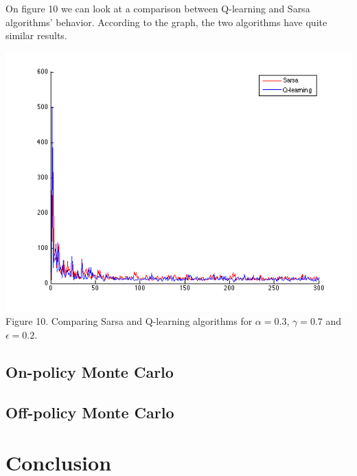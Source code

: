 \documentclass[a4paper,11pt]{article}
\begin{document}
On figure 10 we can look at a comparison between Q-learning and Sarsa algorithms' behavior. According to the graph, the two algorithms have quite similar results.

\begin{center}
\includegraphics[width=1.0\textwidth,height=0.4\textheight]{sarsaQ.png}
\label{Figure 1}
Figure 10. Comparing Sarsa and Q-learning algorithms for $\alpha = 0.3$, $\gamma = 0.7$ and $\epsilon = 0.2$.
\end{center}

\subsection*{On-policy Monte Carlo}


\subsection*{Off-policy Monte Carlo}
\section*{Conclusion}
\end{document}
